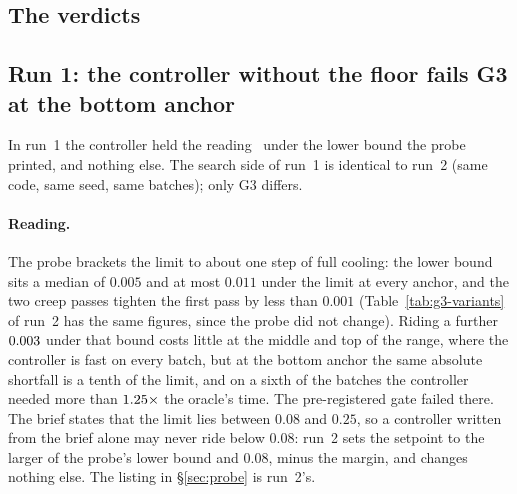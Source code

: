 \documentclass[11pt,a4paper]{article}
\begin{document}
\subsection{The verdicts}

\begin{table}[h]
\centering\small
\resizebox{\linewidth}{!}{}
\caption{The three gates.}
\label{tab:verdicts}
\end{table}

\subsection{Run 1: the controller without the floor fails G3 at the bottom anchor}
\label{sec:run1}

In run~1 the controller held the reading \SZmargin\ under the lower bound the
probe printed, and nothing else. The search side of run~1 is identical to
run~2 (same code, same seed, same batches); only G3 differs.

\begin{table}[h]
\centering\small
\resizebox{\linewidth}{!}{}
\caption{Run 1, G3: the three-pass probe and the controller without the
floor, through the real execution path.}
\label{tab:g3-run1}
\end{table}

\paragraph{Reading.} The probe brackets the limit to about one step of full
cooling: the lower bound sits a median of $0.005$ and at most $0.011$ under
the limit at every anchor, and the two creep passes tighten the first pass by
less than $0.001$ (Table~\ref{tab:g3-variants} of run~2 has the same figures,
since the probe did not change). Riding a further $0.003$ under that bound
costs little at the middle and top of the range, where the controller is fast
on every batch, but at the bottom anchor the same absolute shortfall is a
tenth of the limit, and on a sixth of the batches the controller needed more
than $1.25\times$ the oracle's time. The pre-registered gate failed
there. The brief states that the limit lies between $0.08$ and $0.25$, so a
controller written from the brief alone may never ride below $0.08$: run~2
sets the setpoint to the larger of the probe's lower bound and $0.08$, minus
the margin, and changes nothing else. The listing in \S\ref{sec:probe} is
run~2's.
\end{document}
